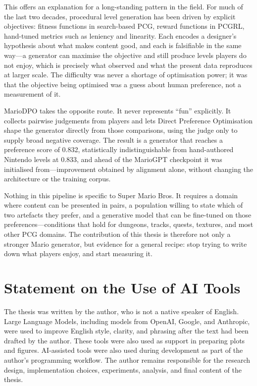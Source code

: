 \documentclass[shortabstract, mgr, english]{iithesis}
\begin{document}
This offers an explanation for a long-standing pattern in the field.
For much of the last two decades, procedural level generation has been driven
by explicit objectives: fitness functions in search-based PCG, reward functions
in PCGRL, hand-tuned metrics such as leniency and linearity. Each encodes a
designer's hypothesis about what makes content good, and each is falsifiable in
the same way---a generator can maximise the objective and still produce levels
players do not enjoy, which is precisely what \citet{marino2015empirical}
observed and what the present data reproduces at larger scale. The difficulty
was never a shortage of optimisation power; it was that the objective being
optimised was a guess about human preference, not a measurement of it.

MarioDPO takes the opposite route. It never represents ``fun''
explicitly. It collects pairwise judgements from players and lets Direct
Preference Optimisation shape the generator directly from those comparisons,
using the judge only to supply broad negative coverage. The result is a
generator that reaches a preference score of 0.832, statistically
indistinguishable from hand-authored Nintendo levels at 0.833, and ahead of the
MarioGPT checkpoint it was initialised from---improvement obtained by
alignment alone, without changing the architecture or the training corpus.

Nothing in this pipeline is specific to Super Mario Bros. It requires
a domain where content can be presented in pairs, a population willing to state
which of two artefacts they prefer, and a generative model that can be
fine-tuned on those preferences---conditions that hold for dungeons, tracks,
quests, textures, and most other PCG domains. The contribution of this thesis
is therefore not only a stronger Mario generator, but evidence for a general
recipe: stop trying to write down what players enjoy, and start measuring it.

\section*{Statement on the Use of AI Tools}

The thesis was written by the author, who is not a native speaker of English. Large
Language Models, including models from OpenAI, Google, and Anthropic, were used to 
improve English style, clarity, and phrasing after the text had
been drafted by the author. These tools were also used as support in preparing
plots and figures. AI-assisted tools were also used during development as part of the
author's programming workflow. The author remains responsible for the research
design, implementation choices, experiments, analysis, and final content of the thesis.






\end{document}

